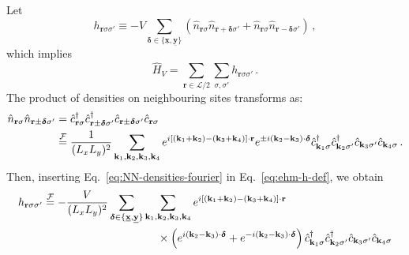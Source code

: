 \begin{tabproof}
	
	Let
	\begin{equation}\label{eq:ehm-h-def}
		h_{\mathbf{r}\sigma\sigma'} \equiv - V \sum_{\bm{\delta}\in \lbrace \underline{\mathbf{x}}, \underline{\mathbf{y}} \rbrace} \left(
			\hat n_{\mathbf{r}\sigma} \hat n_{\mathbf{r} + \bm{\delta} \sigma'} + \hat n_{\mathbf{r}\sigma} \hat n_{\mathbf{r} - \bm{\delta} \sigma'}
		\right) \, ,
	\end{equation}
	which implies
	\begin{equation}\label{eq:HV=sum(h)}
		\hat H_V = \sum_{\mathbf{r}\in\mathcal{L}/2} \sum_{\sigma,\sigma'} h_{\mathbf{r}\sigma\sigma'} \, .
	\end{equation}
	The product of densities on neighbouring sites transforms as:
	\begin{align}
		\hat n_{\mathbf{r}\sigma} \hat n_{\mathbf{r} \pm \bm{\delta} \sigma'} &= \hat c_{\mathbf{r}\sigma}^\dagger \hat c_{\mathbf{r} \pm \bm{\delta} \sigma'}^\dagger \hat c_{\mathbf{r} \pm \bm{\delta} \sigma'} \hat c_{\mathbf{r}\sigma} \nonumber \\
		&\stackrel{\mathcal{F}}{=} \frac{1}{(L_xL_y)^2} \sum_{\mathbf{k}_1,\mathbf{k}_2,\mathbf{k}_3,\mathbf{k}_4}
		e^{i \left[ (\mathbf{k}_1 + \mathbf{k}_2) - (\mathbf{k}_3 + \mathbf{k}_4) \right] \cdot \mathbf{r}} e^{\pm i(\mathbf{k}_2-\mathbf{k}_3) \cdot \bm{\delta}}  \hat c_{\mathbf{k}_1 \sigma}^\dagger \hat c_{\mathbf{k}_2 \sigma'}^\dagger \hat c_{\mathbf{k}_3 \sigma'} \hat c_{\mathbf{k}_4\sigma} \label{eq:NN-densities-fourier} \, .
	\end{align}
	Then, inserting Eq.~\eqref{eq:NN-densities-fourier} in Eq.~\eqref{eq:ehm-h-def}, we obtain
	\[
	\begin{aligned}
		h_{\mathbf{r}\sigma\sigma'} &\Feq -\frac{V}{(L_xL_y)^2} \sum_{\bm{\delta}\in \lbrace \underline{\mathbf{x}}, \underline{\mathbf{y}} \rbrace} \sum_{\mathbf{k}_1,\mathbf{k}_2,\mathbf{k}_3,\mathbf{k}_4} e^{i \left[ (\mathbf{k}_1 + \mathbf{k}_2) - (\mathbf{k}_3 + \mathbf{k}_4) \right] \cdot \mathbf{r}} \\
		&\hspace{0.3\textwidth} \times \left(
		e^{ i(\mathbf{k}_2-\mathbf{k}_3) \cdot \bm{\delta}} + e^{ -i(\mathbf{k}_2-\mathbf{k}_3) \cdot \bm{\delta}}
		\right)
		\hat c_{\mathbf{k}_1 \sigma}^\dagger \hat c_{\mathbf{k}_2 \sigma'}^\dagger \hat c_{\mathbf{k}_3 \sigma'} \hat c_{\mathbf{k}_4\sigma} \\

\end{aligned}\]
\end{tabproof}
